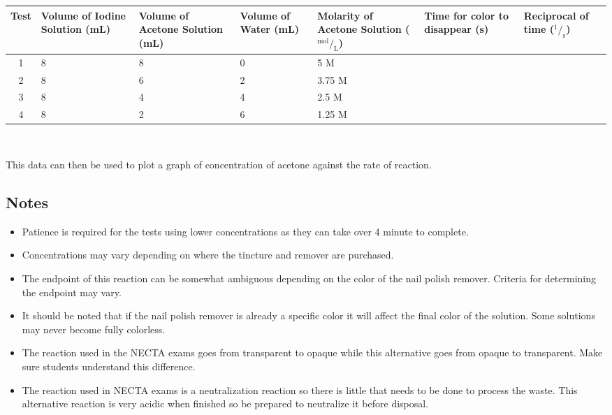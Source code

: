 \begin{center}
\begin{tabular}{|c|p{2cm}|p{2cm}|p{2cm}|p{2cm}|p{2cm}|p{1.5cm}|} \hline
Test&Volume of Iodine Solution (mL)&Volume of Acetone Solution (mL)&Volume of Water (mL)&Molarity of Acetone Solution ($^{\text{mol}}/_\text{L}$)&Time for color to disappear (s)&Reciprocal of time ($^1/_\text{s}$) \\ \hline
1&8&8&0&5 M&& \\ \hline
2&8&6&2&3.75 M&& \\ \hline
3&8&4&4&2.5 M&& \\ \hline
4&8&2&6&1.25 M&& \\ \hline
\end{tabular} \\[10pt]
\end{center}

This data can then be used to plot a graph of concentration of acetone against the rate of reaction.

\subsection{Notes}
\begin{itemize}
\item Patience is required for the tests using lower concentrations as they can take over 4 minute to complete.
\item Concentrations may vary depending on where the tincture and remover are purchased.
\item The endpoint of this reaction can be somewhat ambiguous depending on the color of the nail polish remover. Criteria for determining the endpoint may vary.
\item It should be noted that if the nail polish remover is already a specific color it will affect the final color of the solution. Some solutions may never become fully colorless.
\item The reaction used in the NECTA exams goes from transparent to opaque while this alternative goes from opaque to transparent. Make sure students understand this difference.
\item The reaction used in NECTA exams is a neutralization reaction so there is little that needs to be done to process the waste. This alternative reaction is very acidic when finished so be prepared to 	neutralize it before disposal.
\end{itemize}